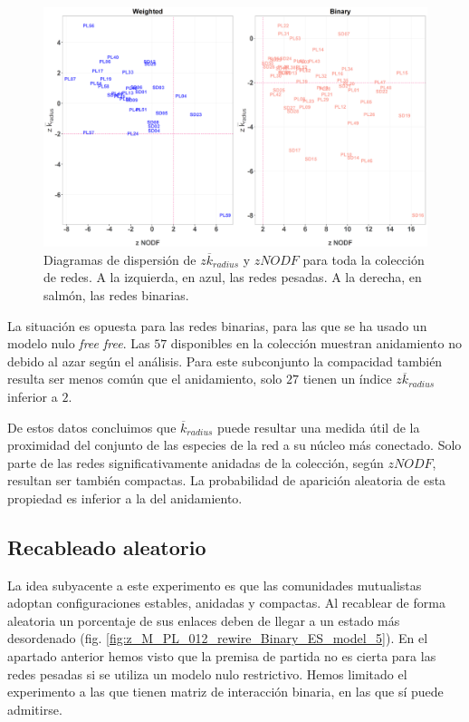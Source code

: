 \begin{figure}[h!]
\centering
\includegraphics[scale=0.35]{Figures/ESTATICA_zscores_all.eps}
\caption {Diagramas de dispersión de $z\overline k_{radius}$ y $zNODF$ para toda la colección de redes. A la izquierda, en azul, las redes pesadas. A la derecha, en salmón, las redes binarias.}
\label{fig:ESTATICA_zscore_all}
\end{figure}

La situación es opuesta para las redes binarias, para las que se ha usado un modelo nulo \textit{free free}. Las $57$ disponibles en la colección muestran anidamiento no debido al azar según el análisis. Para este subconjunto la compacidad también resulta ser menos común que el anidamiento, solo $27$ tienen un índice $z\overline {k}_{radius}$ inferior a $2$.

De estos datos concluimos que $\overline k_{radius}$ puede resultar una medida útil de la proximidad del conjunto de las especies de la red a su núcleo más conectado. Solo parte de las redes significativamente anidadas de la colección, según $zNODF$, resultan ser también compactas. La probabilidad de aparición aleatoria de esta propiedad es inferior a la del anidamiento.


\subsection{Recableado aleatorio}

La idea subyacente a este experimento es que las comunidades mutualistas adoptan configuraciones estables, anidadas y compactas. Al recablear de forma aleatoria un porcentaje de sus enlaces deben de llegar a un estado más desordenado (fig. \ref{fig:z_M_PL_012_rewire_Binary_ES_model_5}). En el apartado anterior hemos visto que la premisa de partida no es cierta para las redes pesadas si se utiliza un modelo nulo restrictivo. Hemos limitado el experimento a las que tienen matriz de interacción binaria, en las que sí puede admitirse.

